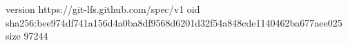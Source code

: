 version https://git-lfs.github.com/spec/v1
oid sha256:bee974df741a156d4a0ba8df9568d6201d32f54a848cde1140462ba677aee025
size 97244

